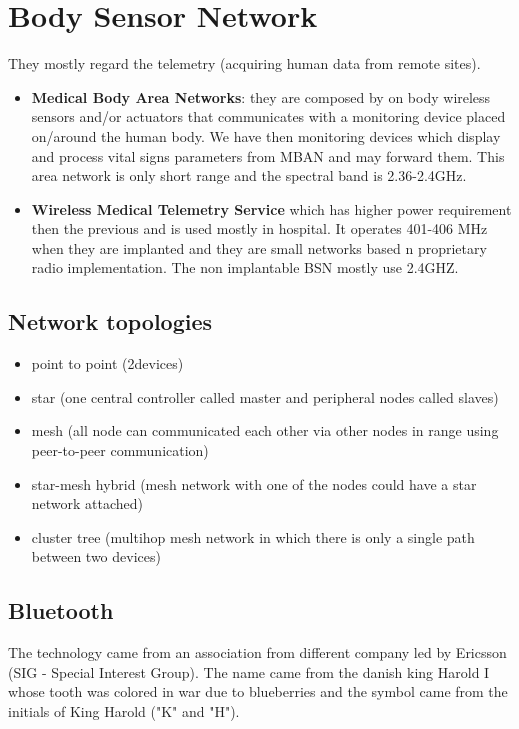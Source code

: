 \chapter{Body Sensor Network}
They mostly regard the telemetry (acquiring human data from remote sites). 
\begin{itemize}
\item \textbf{Medical Body Area Networks}: they are composed by on body wireless sensors and/or actuators that communicates with a monitoring device placed on/around the human body. We have then monitoring devices which display and process vital signs parameters from MBAN and may forward them. This area network is only short range and the spectral band is 2.36-2.4GHz.
\item \textbf{Wireless Medical Telemetry Service} which has higher power requirement then the previous and is used mostly in hospital. It operates 401-406 MHz when they are implanted and they are small networks based n proprietary radio implementation. The non implantable BSN mostly use 2.4GHZ.
\end{itemize} 
\section{Network topologies}
\begin{itemize}
	\item point to point (2devices)
	\item star (one central controller called master and peripheral nodes called slaves)
	\item mesh (all node can communicated each other via other nodes in range using peer-to-peer communication)
	\item star-mesh hybrid (mesh network with one of the nodes could have a star network attached)
	\item cluster tree (multihop mesh network in which there is only a single path between two devices)

\end{itemize} 
\section{Bluetooth}
The technology came from an association from different company led by Ericsson (SIG - Special Interest Group). The name came from the danish king Harold I whose tooth was colored in war due to blueberries and the symbol came from the initials of King Harold ("K" and "H").

